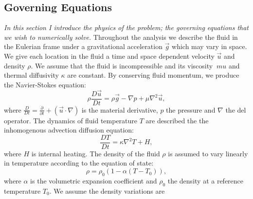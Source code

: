 \documentclass{article}
\begin{document}





\subsection*{Governing Equations}
{\it{In this section I introduce the physics of the problem; the governing equations that we wish to numerically solve.}}
\vspace{0.3cm}
\newline
\noindent Throughout the  analysis we describe the fluid in the Eulerian frame under a gravitational acceleration $\vec{g}$ which may vary in space. We give 
each location in the fluid a time and space dependent velocity $\vec{u}$ and density $\rho$. We assume that  the fluid is incompressible and its viscosity $\
mu$ and thermal diffusivity $\kappa$ are constant. By conserving fluid momentum, we produce the Navier-Stokes equation:
\begin{equation}
	\rho \frac{D \vec{u}}{D t} = \rho \vec{g} - \nabla p + \mu \nabla^2 \vec{u},
	\label{NSE}
\end{equation}
where $\frac{D}{D t} = \frac{\partial }{\partial t} + (\vec{u} \cdot \nabla)$ is the material derivative, $p$ the pressure and $\nabla$ the del 
operator. The dynamics of fluid temperature $T$ are described the the inhomogenous advection diffusion equation:
\begin{equation}
	\frac{D T}{D t} = \kappa \nabla^2 T + H,
	\label{adeT}
\end{equation}
where $H$ is internal heating. The density of the fluid $\rho$ is assumed to vary linearly in temperature according to the equation of state:
\begin{equation}
	\rho = \rho_0 (1- \alpha(T - T_0)),
	\label{equation of state}
\end{equation}
where $\alpha$ is the volumetric expansion coefficient and $\rho_0$ the density at a reference temperature $T_0$. We assume the density variations are 
\end{document}
